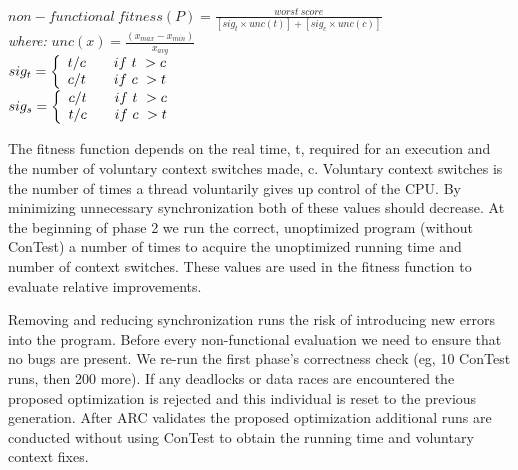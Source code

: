 \documentclass[runningheads,a4paper]{llncs}
\begin{document}
\begin{footnotesize}
\begin{center}
$non-functional\ fitness(P) = \frac{worst\ score}{[sig_t \times unc(t)] + [sig_c \times unc(c)]}$\\
\vspace{2mm} 
\emph{where:} $unc(x) = \frac{(x_{max} - x_{min})}{x_{avg}}$ \\ 
\vspace{1mm}
$
 sig_t = \left\{
 \begin{array}{l l}
   t/c & \quad if\ t\ > c \\
   c/t & \quad if\ c\ > t \\
 \end{array} \right.
$ \\
\vspace{1mm}
$
 sig_s = \left\{
 \begin{array}{l l}
   c/t & \quad if\ t\ > c \\
   t/c & \quad if\ c\ > t \\
 \end{array} \right.
$ \\
\end{center}
\end{footnotesize}
\noindent The fitness function depends on the real time, t, required for an execution and the number of voluntary context switches made, c.  Voluntary context switches is the number of times a thread voluntarily gives up control of the CPU. By minimizing unnecessary synchronization both of these values should decrease. At the beginning of phase 2 we run the correct, unoptimized program (without ConTest) a number of times to acquire the unoptimized running time and number of context switches. These values are used in the fitness function to evaluate relative improvements. 

Removing and reducing synchronization runs the risk of introducing new errors into the program. Before every non-functional evaluation we need to ensure that no bugs are present. We re-run the first phase's correctness check (eg, 10 ConTest runs, then 200 more). If any deadlocks or data races are encountered the proposed optimization is rejected and this individual is reset to the previous generation. After ARC validates the proposed optimization additional runs are conducted without using ConTest to obtain the running time and voluntary context fixes. 
\end{document}
